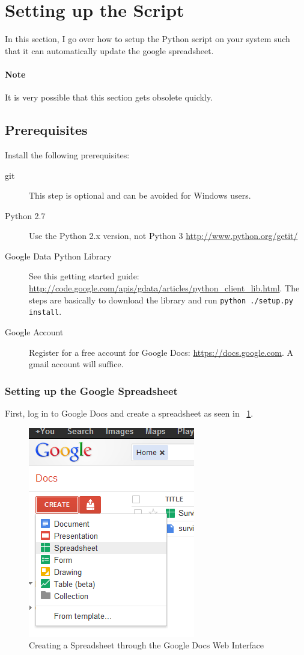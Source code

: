 \section{Setting up the Script}
In this section, I go over how to setup the Python script on your system such that it can automatically update the google spreadsheet.
\paragraph{Note}
It is very possible that this section gets obsolete quickly.
\subsection{Prerequisites}
Install the following prerequisites:
\begin{description}
\item[git]  This step is optional and can be avoided for Windows users.
\item[Python 2.7] Use the Python 2.x version, not Python 3 \url{http://www.python.org/getit/}
\item[Google Data Python Library] See this getting started guide: \url{http://code.google.com/apis/gdata/articles/python_client_lib.html}. The steps are basically to download the library and run \texttt{python ./setup.py install}.
\item[Google Account] Register for a free account for Google Docs: \url{https://docs.google.com}. A gmail account will suffice.
\end{description}

\subsubsection{Setting up the Google Spreadsheet}
First, log in to Google Docs and create a spreadsheet as seen in \figurename\ \ref{fig:create_spreadsheet}.
\begin{figure}[htb]
\centering
\includegraphics[width=0.40\columnwidth]{create_spreadsheet}
\caption{Creating a Spreadsheet through the Google Docs Web Interface}
\label{fig:create_spreadsheet}
\end{figure}
